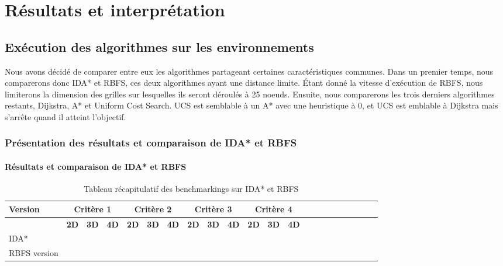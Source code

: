 \documentclass[pidr]{tnreport}
\begin{document}
\chapter{Résultats et interprétation}
	
	\section{Exécution des algorithmes sur les environnements}
	
	Nous avons décidé de comparer entre eux les algorithmes partageant certaines caractéristiques communes. \linebreak
	Dans un premier temps, nous comparerons donc IDA* et RBFS, ces deux algorithmes ayant une distance limite. Étant donné la vitesse d'exécution de RBFS, nous limiterons la dimension des grilles sur lesquelles ils seront déroulés à 25 noeuds. \linebreak
	Ensuite, nous comparerons les trois derniers algorithmes restants, Dijkstra, A* et Uniform Cost Search. UCS est semblable à un A* avec une heuristique à 0, et UCS est emblable à Dijkstra mais s'arrête quand il atteint l'objectif. 
	
		\subsection{Présentation des résultats et comparaison de IDA* et RBFS}
		\subsubsection{Résultats et comparaison de IDA* et RBFS}
		
\begin{table}[h]
\begin{center}
   \begin{tabular}{| l | r | r | r | r | r | r | r | r | r | r | r | r | r | r | r | r | r | r | r | r | r |}
     \hline
      \textbf{Version} & \multicolumn{3}{c|}{\textbf{Critère 1}} & \multicolumn{3}{c|}{\textbf{Critère 2}} & \multicolumn{3}{c|}{\textbf{Critère 3}} & \multicolumn{3}{c|}{\textbf{Critère 4}} \\
     \hline
     \cline{2-5}
    & \textbf{2D} & \textbf{3D} & \textbf{4D} & \textbf{2D} & \textbf{3D} & \textbf{4D} & \textbf{2D} & \textbf{3D} & \textbf{4D} & \textbf{2D} & \textbf{3D} & \textbf{4D}\\ \hline
     IDA* &  &  &  &  &  &  & & &  & & &   \\ \hline
     RBFS version &  &  &  &  &  &  &  & &  &  &  &   \\ \hline
   \end{tabular}
 \end{center}
 \caption{Tableau récapitulatif des benchmarkings sur IDA* et RBFS}
\end{table}		
\end{document}
